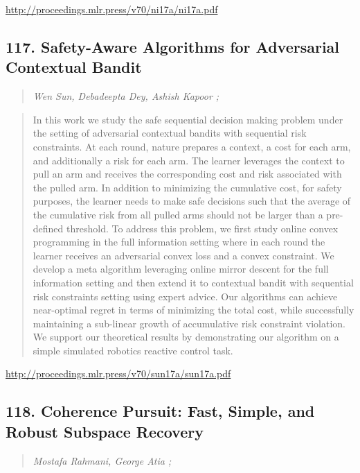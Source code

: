 \documentclass{article}
\begin{document}
\href{http://proceedings.mlr.press/v70/ni17a/ni17a.pdf}{http://proceedings.mlr.press/v70/ni17a/ni17a.pdf}

\subsection{117. Safety-Aware Algorithms for Adversarial Contextual Bandit}

\begin{quote}
\footnotesize{\textit{Wen Sun, Debadeepta Dey, Ashish Kapoor ;}}

\end{quote}

\begin{quote}
    In this work we study the safe sequential decision making problem under the setting of adversarial contextual bandits with sequential risk constraints. At each round, nature prepares a context, a cost for each arm, and additionally a risk for each arm. The learner leverages the context to pull an arm and receives the corresponding cost and risk associated with the pulled arm. In addition to minimizing the cumulative cost, for safety purposes, the learner needs to make safe decisions such that the average of the cumulative risk from all pulled arms should not be larger than a pre-defined threshold. To address this problem, we first study online convex programming in the full information setting where in each round the learner receives an adversarial convex loss and a convex constraint. We develop a meta algorithm leveraging online mirror descent for the full information setting and then extend it to contextual bandit with sequential risk constraints setting using expert advice. Our algorithms can achieve near-optimal regret in terms of minimizing the total cost, while successfully maintaining a sub-linear growth of accumulative risk constraint violation. We support our theoretical results by demonstrating our algorithm on a simple simulated robotics reactive control task.  
\end{quote}

\href{http://proceedings.mlr.press/v70/sun17a/sun17a.pdf}{http://proceedings.mlr.press/v70/sun17a/sun17a.pdf}

\subsection{118. Coherence Pursuit: Fast, Simple, and Robust Subspace Recovery}

\begin{quote}
\footnotesize{\textit{Mostafa Rahmani, George Atia ;}}

\end{quote}
\end{document}

